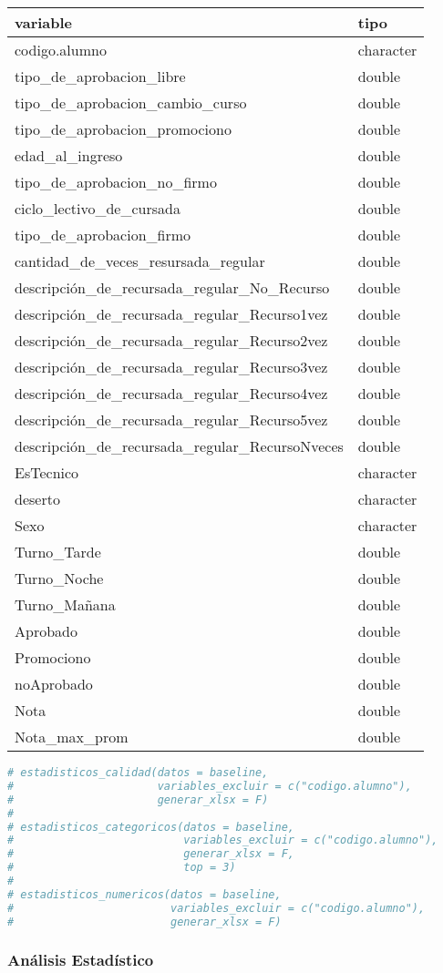 \begin{longtable}[]{@{\extracolsep{\fill}}ll@{}}
\toprule
variable & tipo\tabularnewline
\midrule
\endhead
codigo.alumno & character\tabularnewline
tipo\_de\_aprobacion\_libre & double\tabularnewline
tipo\_de\_aprobacion\_cambio\_curso & double\tabularnewline
tipo\_de\_aprobacion\_promociono & double\tabularnewline
edad\_al\_ingreso & double\tabularnewline
tipo\_de\_aprobacion\_no\_firmo & double\tabularnewline
ciclo\_lectivo\_de\_cursada & double\tabularnewline
tipo\_de\_aprobacion\_firmo & double\tabularnewline
cantidad\_de\_veces\_resursada\_regular & double\tabularnewline
descripción\_de\_recursada\_regular\_No\_Recurso & double\tabularnewline
descripción\_de\_recursada\_regular\_Recurso1vez & double\tabularnewline
descripción\_de\_recursada\_regular\_Recurso2vez & double\tabularnewline
descripción\_de\_recursada\_regular\_Recurso3vez & double\tabularnewline
descripción\_de\_recursada\_regular\_Recurso4vez & double\tabularnewline
descripción\_de\_recursada\_regular\_Recurso5vez & double\tabularnewline
descripción\_de\_recursada\_regular\_RecursoNveces &
double\tabularnewline
EsTecnico & character\tabularnewline
deserto & character\tabularnewline
Sexo & character\tabularnewline
Turno\_Tarde & double\tabularnewline
Turno\_Noche & double\tabularnewline
Turno\_Mañana & double\tabularnewline
Aprobado & double\tabularnewline
Promociono & double\tabularnewline
noAprobado & double\tabularnewline
Nota & double\tabularnewline
Nota\_max\_prom & double\tabularnewline
\bottomrule
\end{longtable}

\begin{lstlisting}[language=R]
# estadisticos_calidad(datos = baseline,
#                      variables_excluir = c("codigo.alumno"),
#                      generar_xlsx = F)
# 
# estadisticos_categoricos(datos = baseline,
#                          variables_excluir = c("codigo.alumno"),
#                          generar_xlsx = F,
#                          top = 3)
# 
# estadisticos_numericos(datos = baseline,
#                        variables_excluir = c("codigo.alumno"),
#                        generar_xlsx = F)
\end{lstlisting}










\subsubsection{Análisis Estadístico}\label{anuxe1lisis-estaduxedstico}

